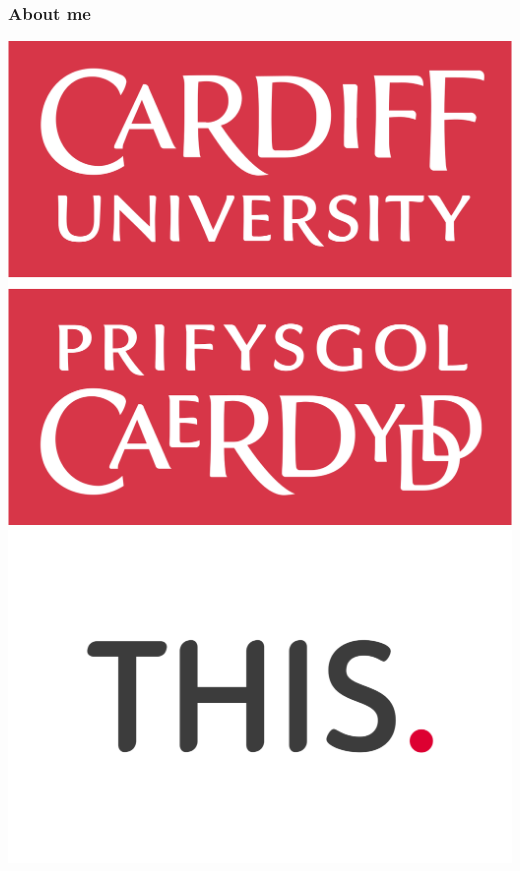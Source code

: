 \begin{frame}
    \frametitle{About me}
    \centering
        
    \includegraphics[scale=0.1]{Bin/CardiffUniLogo.png}
    \includegraphics[scale=0.15]{Bin/THISLogo.png}

\end{frame}
